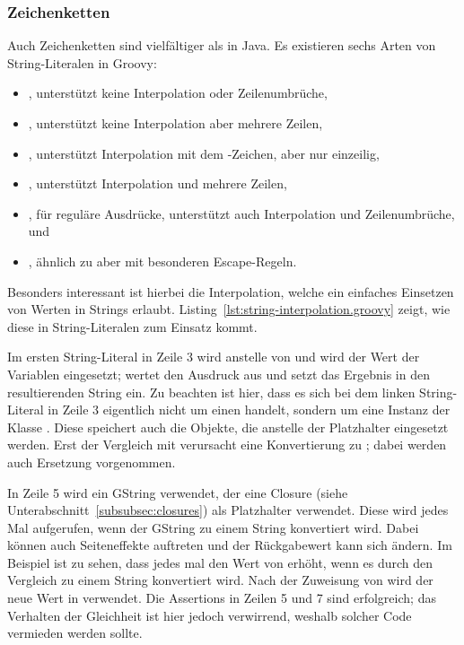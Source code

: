 \subsubsection{Zeichenketten}\label{subsubsec:strings}

Auch Zeichenketten sind vielfältiger als in Java.
Es existieren sechs Arten von String-Literalen in Groovy:

\begin{itemize}\setlength{\itemsep}{0pt}\setlength{\parskip}{0pt}\setlength{\parsep}{0pt}
\item {}, unterstützt keine Interpolation oder Zeilenumbrüche,
\item {}, unterstützt keine Interpolation aber mehrere Zeilen,
\item {}, unterstützt Interpolation mit dem \code{$}-Zeichen, aber nur einzeilig,
\item {}, unterstützt Interpolation und mehrere Zeilen,
\item {}, für reguläre Ausdrücke, unterstützt auch Interpolation und Zeilenumbrüche, und
\item {}, ähnlich zu  aber mit besonderen Escape-Regeln.
\end{itemize}

Besonders interessant ist hierbei die Interpolation, welche ein einfaches Einsetzen von Werten in Strings erlaubt.
Listing~\ref{lst:string-interpolation.groovy} zeigt, wie diese in String-Literalen zum Einsatz kommt.


Im ersten String-Literal in Zeile 3 wird anstelle von  und  wird der Wert der Variablen eingesetzt;
 wertet den Ausdruck  aus und setzt das Ergebnis in den resultierenden String ein.
Zu beachten ist hier, dass es sich bei dem linken String-Literal in Zeile 3 eigentlich nicht um einen  handelt, sondern um eine Instanz der Klasse .
Diese speichert auch die Objekte, die anstelle der Platzhalter eingesetzt werden.
Erst der Vergleich mit \code{==} verursacht eine Konvertierung zu ; dabei werden auch Ersetzung vorgenommen.

In Zeile 5 wird ein GString verwendet, der eine Closure (siehe Unterabschnitt~\ref{subsubsec:closures}) als Platzhalter verwendet.
Diese wird jedes Mal aufgerufen, wenn der GString zu einem String konvertiert wird.
Dabei können auch Seiteneffekte auftreten und der Rückgabewert kann sich ändern.
Im Beispiel ist zu sehen, dass  jedes mal den Wert von  erhöht, wenn es durch den Vergleich zu einem String konvertiert wird.
Nach der Zuweisung von  wird der neue Wert in  verwendet.
Die Assertions in Zeilen 5 und 7 sind erfolgreich; das Verhalten der Gleichheit ist hier jedoch verwirrend, weshalb solcher Code vermieden werden sollte.

